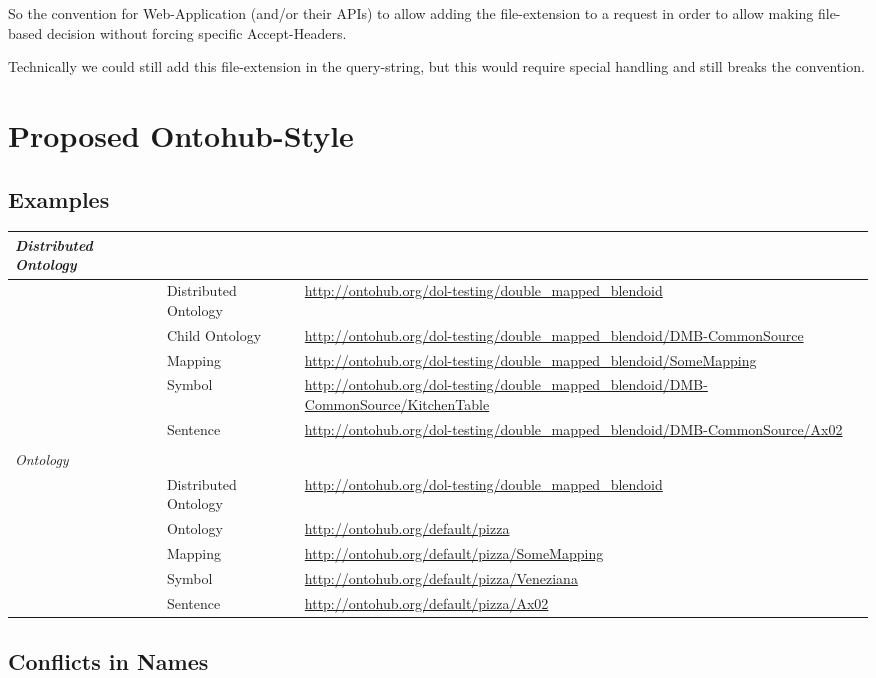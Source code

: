 \documentclass[a4paper,11pt,DIV=25]{scrartcl}
\begin{document}
So the convention for Web-Application (and/or their APIs) to allow adding the
file-extension to a request in order to allow making file-based decision
without forcing specific Accept-Headers.

Technically we could still add this file-extension in the query-string, but
this would require special handling and still breaks the convention.

\section{Proposed Ontohub-Style}

\subsection{Examples}

\begin{tabularx}{\textwidth}{p{}p{}p{}}
  \textit{Distributed Ontology} & & \\
  \hline
  & Distributed Ontology & \url{http://ontohub.org/dol-testing/double_mapped_blendoid}\\
  & Child Ontology & \url{http://ontohub.org/dol-testing/double_mapped_blendoid/DMB-CommonSource}\\
  & Mapping & \url{http://ontohub.org/dol-testing/double_mapped_blendoid/SomeMapping}\\
  & Symbol & \url{http://ontohub.org/dol-testing/double_mapped_blendoid/DMB-CommonSource/KitchenTable}\\
  & Sentence & \url{http://ontohub.org/dol-testing/double_mapped_blendoid/DMB-CommonSource/Ax02}\\
  & & \\
  \textit{Ontology} & & \\
  \hline
  & Distributed Ontology & \url{http://ontohub.org/dol-testing/double_mapped_blendoid}\\
  & Ontology & \url{http://ontohub.org/default/pizza}\\
  & Mapping & \url{http://ontohub.org/default/pizza/SomeMapping}\\
  & Symbol & \url{http://ontohub.org/default/pizza/Veneziana}\\
  & Sentence & \url{http://ontohub.org/default/pizza/Ax02}\\
\end{tabularx}

\subsection{Conflicts in Names}
\end{document}
